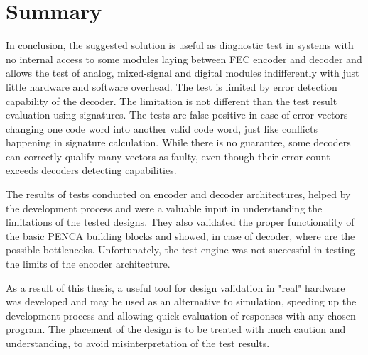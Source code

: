 \section{Summary}

In conclusion, the suggested solution is useful as diagnostic test in systems with no internal access to some modules laying between FEC encoder and decoder and allows the test of analog, mixed-signal and digital modules indifferently with just little hardware and software overhead. The test is limited by error detection capability of the decoder. The limitation is not different than the test result evaluation using signatures. The tests are false positive in case of error vectors changing one code word into another valid code word, just like conflicts happening in signature calculation. While there is no guarantee, some decoders can correctly qualify many vectors as faulty, even though their error count exceeds decoders detecting capabilities.

The results of tests conducted on encoder and decoder architectures, helped by the development process and were a valuable input in understanding the limitations of the tested designs. They also validated the proper functionality of the basic PENCA building blocks and showed, in case of decoder, where are the possible bottlenecks. Unfortunately, the test engine was not successful in testing the limits of the encoder architecture.

As a result of this thesis, a useful tool for design validation in "real" hardware was developed and may be used as an alternative to simulation, speeding up the development process and allowing quick evaluation of responses with any chosen program. The placement of the design is to be treated with much caution and understanding, to avoid misinterpretation of the test results.